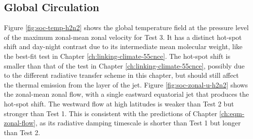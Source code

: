 \subsection{Global Circulation}

Figure \ref{fig:soc-temp-h2n2} shows the global temperature field at the pressure level of the maximum zonal-mean zonal velocity for Test 3. It has a distinct hot-spot shift and day-night contrast due to its intermediate mean molecular weight, like the best-fit test in Chapter \ref{ch:linking-climate-55cnce}. The hot-spot shift is smaller than that of the test in Chapter \ref{ch:linking-climate-55cnce}, possibly due to the different radiative transfer scheme in this chapter, but should still affect the thermal emission from the layer of the jet. Figure \ref{fig:soc-zonal-u-h2n2} shows the zonal-mean zonal flow, with a single eastward equatorial jet that produces the hot-spot shift. The westward flow at high latitudes is weaker than Test 2 but stronger than Test 1. This is consistent with the predictions of Chapter \ref{ch:eqm-zonal-flow}, as its radiative damping timescale is shorter than Test 1 but longer than Test 2.


